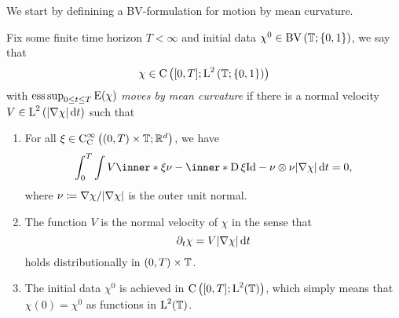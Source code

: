 We start by definining a BV-formulation for motion by mean curvature.

\begin{definition}
	\label{motion_by_mcv}
	Fix some finite time horizon $ T < \infty $ and initial data $ \chi^{ 0 }\in \operatorname{BV} \left( \operatorname{\mathbb{T}} ; \{ 0 , 1 \} \right) $, we say that 
	\begin{equation*}
		\chi \in 
		\operatorname{C} \left(
		[ 0 , T ] ; \operatorname{L}^{ 2 } \left( \operatorname{\mathbb{T}} ; \{ 0 , 1 \}  \right)
		\right)
	\end{equation*}
	with $ \operatorname*{ess\,sup}_{ 0 \leq t \leq T } \operatorname{E} ( \chi ) $ \emph{moves by mean curvature} if there is a normal velocity
	$ V \in \operatorname{L}^{ 2 } \left( \abs{ \nabla \chi } \dd{ t } \right) $ such that 
	\begin{enumerate}
		\item 
		For all 
		$ \xi \in \operatorname{C}_{ \mathrm{ C } }^{ \infty } \left( ( 0 , T ) \times \operatorname{\mathbb{T}} ; \mathbb{ R }^{ d } \right) $,
		we have
		\begin{equation}
			\label{integral_formulation_of_mcf}
			\int_{ 0 }^{ T }
			\int
			V \inner*{ \xi }{ \nu }
			- 
			\inner*{ \diff \xi }{ \mathrm{ Id } - \nu \otimes \nu }
			\abs{ \nabla \chi }
			\dd{ t }
			=
			0,
		\end{equation}
		where $ \nu \coloneqq \nabla \chi / \abs{ \nabla \chi } $ is the outer unit normal.
		\item 
		The function $ V $ is the normal velocity of $ \chi $ in the sense that 
		\begin{equation*}
			\partial_{ t } \chi
			=
			V
			\abs{ \nabla \chi }
			\dd{ t }
		\end{equation*}
		holds distributionally in $ ( 0 , T ) \times \operatorname{\mathbb{T}} $.
		\item 
		The initial data $ \chi^{ 0 } $ is achieved in $ \operatorname{C} \left( [ 0 , T ] ; \operatorname{L}^{  2 } ( \operatorname{\mathbb{T}} ) \right) $, which simply means that $ \chi ( 0 ) = \chi^{ 0 } $ as functions in $ \operatorname{L}^{ 2 } ( \operatorname{\mathbb{T}} ) $.
	\end{enumerate}
\end{definition}

